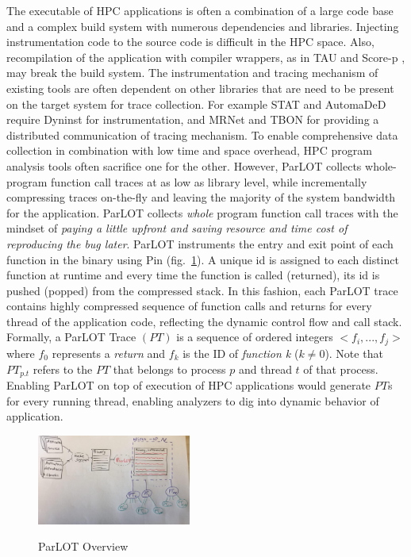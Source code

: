 The executable of HPC applications is often a combination of a large code base and a complex build system with numerous dependencies and libraries.
%
Injecting instrumentation code to the source code is difficult in the HPC space.
%
Also, recompilation of the application with compiler wrappers, as in TAU \cite{tau} and Score-p \cite{scorep}, may break the build system.
%
The instrumentation and tracing mechanism of existing tools are often dependent on other libraries that are need to be present on the target system for trace collection.
%
For example STAT \cite{stat} and AutomaDeD \cite{automaded-laguna} require Dyninst \cite{dyninst} for instrumentation, and MRNet\cite{mrnet} and  TBON\cite{tbon} for providing a distributed communication of tracing mechanism.
%
To enable comprehensive data collection in combination with low time and space overhead, HPC program analysis tools often sacrifice one for the other.
%
However, ParLOT collects whole-program function call traces at as low as library level, while incrementally compressing traces on-the-fly and leaving the majority of the system bandwidth for the application.
%
ParLOT collects \textit{whole} program function call traces with the mindset of \textit{paying a little upfront and saving resource and time cost of reproducing the bug later}.
%
ParLOT instruments the entry and exit point of each function in the binary using Pin \cite{pin} (fig.~\ref{fig.parlotOverview}). 
%
A unique id is assigned to each distinct function at runtime and every time the  function is called (returned), its id is pushed (popped) from the compressed stack.
%
In this fashion, each ParLOT trace contains highly compressed sequence of function calls and returns for every thread of the application code, reflecting the dynamic control flow and call stack.
%
Formally, a ParLOT Trace \textbf{$(PT)$} is a sequence of ordered integers $<f_i,...,f_j>$ where $f_0$ represents a \textit{return} and $f_k$ is the ID of \textit{function k} ($k \neq 0$).
%
Note that $PT_{p.t}$ refers to the $PT$ that belongs to process $p$ and thread $t$ of that process.
%
Enabling ParLOT on top of execution of HPC applications would generate $PT$s for every running thread, enabling analyzers to dig into dynamic behavior of application.
\begin{figure}[t]
\caption{ParLOT Overview}
\includegraphics[width=0.45\textwidth]{figs/parlotOverview.jpg}
\label{fig.parlotOverview}
\end{figure}

